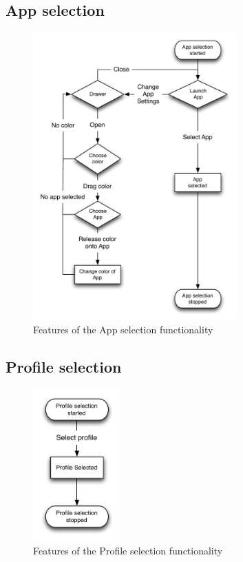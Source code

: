 \subsection{App selection}
\begin{figure}[h]
	\centering
	\includegraphics[width=0.7\textwidth]{gfx/appselection.pdf}
	\caption{Features of the App selection functionality}
	\label{fig:appselection_design}
\end{figure}
\subsection{Profile selection}
\begin{figure}[h]
	\centering
	\includegraphics[width=0.3\textwidth]{gfx/profileselect_design.pdf}
	\caption{Features of the Profile selection functionality}
	\label{fig:profileselection_design}
\end{figure}